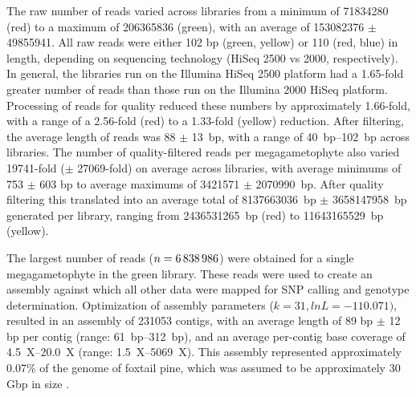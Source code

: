 \documentclass[smallextended]{svjour3}
\begin{document}
The raw number of reads varied across libraries from a minimum of \num{71834280}
(red) to a maximum of \num{206365836} (green), with an average of
\num{153082376} $\pm$ \num{49855941}. All raw reads were either 102 bp (green,
yellow) or 110 (red, blue) in length, depending on sequencing technology (HiSeq
2500 vs 2000, respectively). In general, the libraries run on the Illumina HiSeq
2500 platform had a \num{1.65}-fold greater number of reads than those run on
the Illumina 2000 HiSeq platform. Processing of reads for quality reduced these
numbers by approximately \num{1.66}-fold, with a range of a \num{2.56}-fold
(red) to a \num{1.33}-fold (yellow) reduction. After filtering, the average
length of reads was 88 $\pm$ \SI{13}{bp}, with a range of \SIrange{40}{102}{bp}
across libraries.  The number of quality-filtered reads per megagametophyte also
varied \num{19741}-fold ($\pm$ \num{27069}-fold) on average across libraries,
with average minimums of 753 $\pm$ 603 bp to average maximums of \num{3421571}
$\pm$ \SI{2070990}{bp}. After quality filtering this translated into an average
total of \SI{8137663036}{bp} $\pm$ \SI{3658147958}{bp} generated per library,
ranging from \SI{2436531265}{bp} (red) to \SI{11643165529}{bp} (yellow).

The largest number of reads ($n=\text{\num{6838986}}$) were obtained for a
single megagametophyte in the green library. These reads were used to create an
assembly against which all other data were mapped for SNP calling and genotype
determination. Optimization of assembly parameters ($k=31, lnL=-110.071)$,
resulted in an assembly of \num{231053} contigs, with an average length of 89 bp
$\pm$ 12 bp per contig (range: \SIrange {61}{312}{bp}), and an average
per-contig base coverage of \SIrange{4.5}{20.0}{X} (range:
\SIrange{1.5}{5069}{X}). This assembly represented approximately 0.07\% of the
genome of foxtail pine, which was assumed to be approximately 30 Gbp in size
\citep{Murray:1998}.
\end{document}
